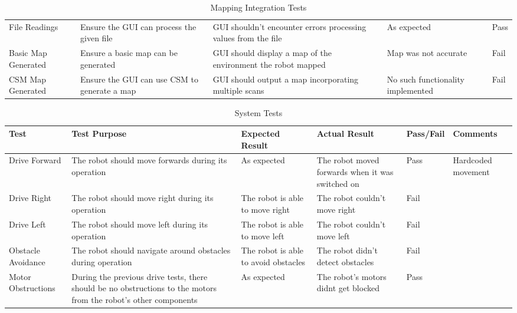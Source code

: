 \begin{appendices}
\begin{landscape}
\begin{table}[h!]
\begin{tabular}{| p{2.5cm} | p{5cm} | p{4cm} | p{3cm} | p{1.5cm} |}
							File Readings & Ensure the GUI can process the given file & GUI shouldn't encounter errors processing values from the file & As expected & Pass \\
							
							Basic Map Generated & Ensure a basic map can be generated  & GUI should display a map of the environment the robot mapped & Map was not accurate & Fail \\ 
							
							CSM Map Generated & Ensure the GUI can use CSM to generate a map  & GUI should output a map incorporating multiple scans & No such functionality implemented & Fail \\ [1ex] 
							\hline
						\end{tabular}
						\caption{Mapping Integration Tests}
						\label{table:mappingtests}		
					\end{table}
				
					\centering
					\begin{longtable}{| p{2.5cm} | p{5cm} | p{4cm} | p{4cm} | p{1.5cm} | p{2cm} |} 
						\caption{System Tests}
						\label{systemintergrationtestingtable} \\
						\hline
						Test & Test Purpose & Expected Result & Actual Result & Pass/Fail & Comments \\ [0.5ex] 
						\hline
						Drive Forward & The robot should move forwards during its operation & As expected & The robot moved forwards when it was switched on & Pass & Hardcoded movement  \\
	
						Drive Right & The robot should move right during its operation & The robot is able to move right & The robot couldn't move right & Fail &   \\
							
						Drive Left & The robot should move left during its operation & The robot is able to move left & The robot couldn't move left & Fail &   \\
						
						Obstacle Avoidance & The robot should navigate around obstacles during operation & The robot is able to avoid obstacles & The robot didn't detect obstacles & Fail &   \\
							
						Motor Obstructions & During the previous drive tests, there should be no obstructions to the motors from the robot's other components & As expected & The robot's motors didnt get blocked & Pass &   \\
						

\end{longtable}
\end{landscape}
\end{appendices}
